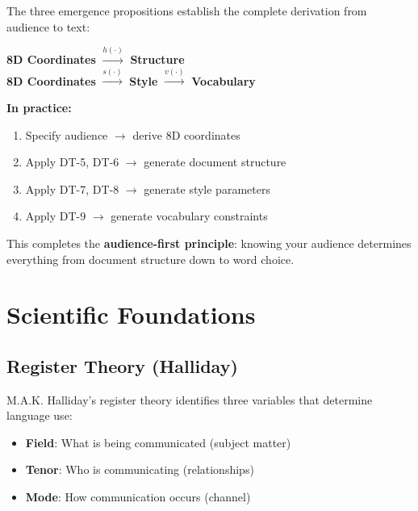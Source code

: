 \begin{tcolorbox}[colback=yellow!5!white, colframe=yellow!75!black,
    title=Complete Emergence Chain]

The three emergence propositions establish the complete derivation from audience to text:

\begin{center}
\textbf{8D Coordinates} $\xrightarrow{h(\cdot)}$ \textbf{Structure} \\[0.5em]
\textbf{8D Coordinates} $\xrightarrow{s(\cdot)}$ \textbf{Style} $\xrightarrow{v(\cdot)}$ \textbf{Vocabulary}
\end{center}

\textbf{In practice:}
\begin{enumerate}[nosep]
\item Specify audience $\to$ derive 8D coordinates
\item Apply DT-5, DT-6 $\to$ generate document structure
\item Apply DT-7, DT-8 $\to$ generate style parameters
\item Apply DT-9 $\to$ generate vocabulary constraints
\end{enumerate}

This completes the \textbf{audience-first principle}: knowing your audience determines
everything from document structure down to word choice.

\end{tcolorbox}


\section{Scientific Foundations}
\label{sec:doctype-theory-foundations}

\subsection{Register Theory (Halliday)}

M.A.K. Halliday's register theory \citep{halliday1989} identifies three
variables that determine language use:

\begin{itemize}[nosep]
\item \textbf{Field}: What is being communicated (subject matter)
\item \textbf{Tenor}: Who is communicating (relationships)
\item \textbf{Mode}: How communication occurs (channel)
\end{itemize}

